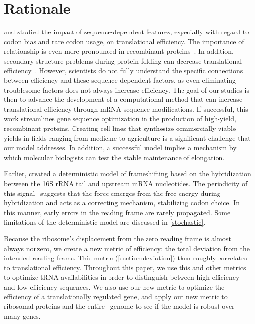 \documentclass[12pt]{article}
\begin{document}
\section{Rationale}
\citet{kozak05} and \citet{kane95} studied the impact
of sequence-dependent features, especially with regard to codon bias 
and rare codon usage, on translational efficiency.  The importance of 
relationship is even more pronounced in recombinant 
proteins~\cite{sorensen05}.  In addition, secondary structure problems 
during protein folding can decrease translational 
efficiency~\cite{kozak05}.  However, scientists do not fully
understand the specific connections between efficiency and these
sequence-dependent factors, as even eliminating troublesome factors
does not always increase efficiency. The goal of our studies is then to
advance the development of a computational method that can increase
translational efficiency through mRNA sequence modifications. If
successful, this work streamlines gene sequence optimization in the
production of high-yield, recombinant proteins. Creating cell lines
that synthesize commercially viable yields in fields ranging from
medicine to agriculture is a significant challenge that our model
addresses. In addition, a successful model implies a mechanism by
which molecular biologists can test the stable maintenance of
elongation.

Earlier, \citet{lalit:jbsb} created a deterministic model of
frameshifting based on the hybridization between the 16S rRNA tail and
upstream mRNA nucleotides.  The periodicity of this
signal~\cite{lalit:jbsb} suggests that the force emerges from the free
energy during hybridization and acts as a correcting mechanism,
stabilizing codon choice.  In this manner, early errors in the reading
frame are rarely propagated.  Some limitations of the deterministic 
model are discussed in \autoref{stochastic}.

Because the ribosome's displacement from the zero reading frame is
almost always nonzero, we create a new metric of efficiency: the total 
deviation from the intended reading frame.  This metric
(\autoref{section:deviation}) then roughly correlates to translational
efficiency.  Throughout this paper, we use this and other metrics to
optimize tRNA availabilities in order to distinguish between
high-efficiency and low-efficiency sequences. We also use our new
metric to optimize the efficiency of a translationally regulated gene, 
and apply our new metric to ribosomal proteins and the entire \ecoli\ 
genome to see if the model is robust over many genes.
\end{document}
